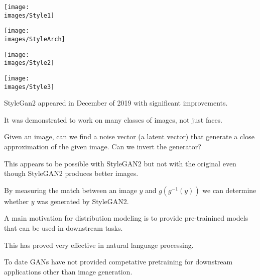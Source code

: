 {\centerline{\texttt{[image: \\images/Style1]}}


\centerline{\texttt{[image: \\images/StyleArch]}}


\centerline{\texttt{[image: \\images/Style2]}}


\centerline{\texttt{[image: \\images/Style3]}}


StyleGan2 appeared in December of 2019 with significant improvements.

\vfill
It was demonstrated to work on many classes of images, not just faces.


Given an image, can we find a noise vector (a latent vector) that generate a close approximation of
the given image.  Can we invert the generator?

\vfill
This appears to be possible with StyleGAN2 but not with the original even though StyleGAN2 produces better images.

\vfill
By measuring the match between an image $y$ and $g(g^{-1}(y))$ we can determine whether $y$ was generated by StyleGAN2.


A main motivation for distribution modeling is to provide pre-trainined models that can be used in downstream tasks.

\vfill
This has proved very effective in natural language processing.

\vfill
To date GANs have not provided competative pretraining for downstream applications other than image generation.


}

